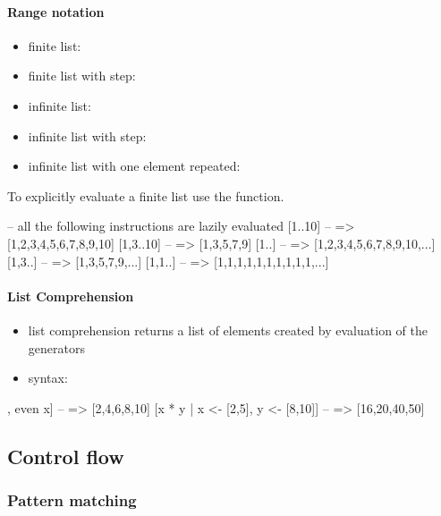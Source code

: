 \documentclass[a4paper,landscape,10pt]{article}
\begin{document}
\begin{multicols*}{2}
  \paragraph{Range notation}

  \begin{itemize}
    \item finite list: 
    \item finite list with step: 
    \item infinite list: \ihaskell{[<start>..]}
    \item infinite list with step: 
    \item infinite list with one element repeated: 
  \end{itemize}

  To explicitly evaluate a finite list use the  function.

  \begin{haskell}
-- all the following instructions are lazily evaluated
[1..10] -- => [1,2,3,4,5,6,7,8,9,10]
[1,3..10] -- => [1,3,5,7,9]
[1..] -- => [1,2,3,4,5,6,7,8,9,10,...]
[1,3..] -- => [1,3,5,7,9,...]
[1,1..] -- => [1,1,1,1,1,1,1,1,1,1,...]
\end{haskell}

  \paragraph{List Comprehension}

  \begin{itemize}
    \item list comprehension returns a list of elements created by evaluation of the generators
    \item syntax: 
  \end{itemize}

  \begin{haskell}
[x | x <- [1..10], even x] -- => [2,4,6,8,10]
[x * y | x <- [2,5], y <- [8,10]] -- => [16,20,40,50]
\end{haskell}

  \subsection{Control flow}

  \subsubsection{Pattern matching}


\end{multicols*}
\end{document}
